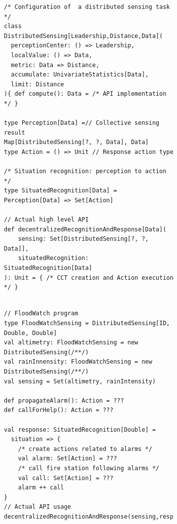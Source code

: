 \begin{figure}
  \begin{subfigure}[b]{0.9\linewidth}
    \centering
    \begin{lstlisting}[language=scafi, basicstyle=\footnotesize\ttfamily, caption=Scala API for decentralized situation recognition, label=code:api]
/* Configuration of  a distributed sensing task */
class DistributedSensing[Leadership,Distance,Data](
  perceptionCenter: () => Leadership,
  localValue: () => Data,
  metric: Data => Distance,
  accumulate: UnivariateStatistics[Data],
  limit: Distance
){ def compute(): Data = /* API implementation */ }

type Perception[Data] =// Collective sensing result
Map[DistributedSensing[?, ?, Data], Data]
type Action = () => Unit // Response action type

/* Situation recognition: perception to action */
type SituatedRecognition[Data] = Perception[Data] => Set[Action]

// Actual high level API
def decentralizedRecognitionAndResponse[Data](
    sensing: Set[DistributedSensing[?, ?, Data]],
    situatedRecognition: SituatedRecognition[Data]
): Unit = { /* CCT creation and Action execution */ }
    
\end{lstlisting}
  \end{subfigure}
  \hfill
  \begin{subfigure}[b]{0.9\linewidth}
    \centering
\begin{lstlisting}[language=scafi,basicstyle=\footnotesize\ttfamily, caption=Example use of the API for the case study, label=code:example]
// FloodWatch program
type FloodWatchSensing = DistributedSensing[ID, Double, Double]
val altimetry: FloodWatchSensing = new DistributedSensing(/**/)
val rainInnensity: FloodWatchSensing = new DistributedSensing(/**/)
val sensing = Set(altimetry, rainIntensity)

def propagateAlarm(): Action = ???
def callForHelp(): Action = ???

val response: SituatedRecognition[Double] = 
  situation => {
    /* create actions related to alarms */
    val alarm: Set[Action] = ???
    /* call fire station following alarms */
    val call: Set[Action] = ???
    alarm ++ call
}
// Actual API usage
decentralizedRecognitionAndResponse(sensing,response)
\end{lstlisting}


\end{subfigure}
\end{figure}
